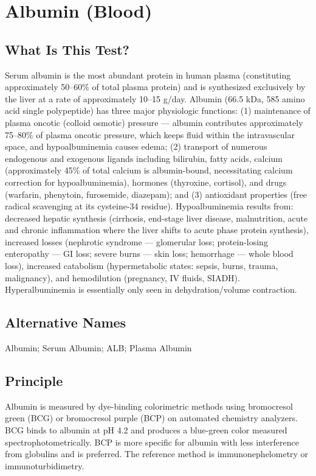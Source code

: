 \chapter{Albumin (Blood)}
\section*{What Is This Test?}
Serum albumin is the most abundant protein in human plasma (constituting approximately 50--60\% of total plasma protein) and is synthesized exclusively by the liver at a rate of approximately 10--15 g/day. Albumin (66.5 kDa, 585 amino acid single polypeptide) has three major physiologic functions: (1) maintenance of plasma oncotic (colloid osmotic) pressure --- albumin contributes approximately 75--80\% of plasma oncotic pressure, which keeps fluid within the intravascular space, and hypoalbuminemia causes edema; (2) transport of numerous endogenous and exogenous ligands including bilirubin, fatty acids, calcium (approximately 45\% of total calcium is albumin-bound, necessitating calcium correction for hypoalbuminemia), hormones (thyroxine, cortisol), and drugs (warfarin, phenytoin, furosemide, diazepam); and (3) antioxidant properties (free radical scavenging at its cysteine-34 residue). Hypoalbuminemia results from: decreased hepatic synthesis (cirrhosis, end-stage liver disease, malnutrition, acute and chronic inflammation where the liver shifts to acute phase protein synthesis), increased losses (nephrotic syndrome --- glomerular loss; protein-losing enteropathy --- GI loss; severe burns --- skin loss; hemorrhage --- whole blood loss), increased catabolism (hypermetabolic states: sepsis, burns, trauma, malignancy), and hemodilution (pregnancy, IV fluids, SIADH). Hyperalbuminemia is essentially only seen in dehydration/volume contraction.
\section*{Alternative Names}
Albumin; Serum Albumin; ALB; Plasma Albumin
\section*{Principle}
Albumin is measured by dye-binding colorimetric methods using bromocresol green (BCG) or bromocresol purple (BCP) on automated chemistry analyzers. BCG binds to albumin at pH 4.2 and produces a blue-green color measured spectrophotometrically. BCP is more specific for albumin with less interference from globulins and is preferred. The reference method is immunonephelometry or immunoturbidimetry.
